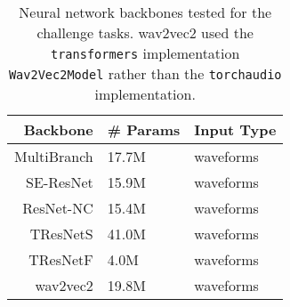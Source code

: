 
\begin{table}[!htp]
\centering
\begin{tabular}{r|l|l}
    \hline
    Backbone & \# Params & Input Type \\ \hline
    MultiBranch \cite{Kang_2022_cinc2021_iop} & 17.7M & waveforms \\
    SE-ResNet \cite{Kang_2022_cinc2021_iop} & 15.9M & waveforms  \\
    ResNet-NC \cite{ribeiro2020automatic} & 15.4M & waveforms  \\
    TResNetS \cite{Kang_2022_cinc2021_iop} & 41.0M & waveforms  \\
    TResNetF \cite{Kang_2022_cinc2021_iop} & 4.0M & waveforms  \\
    wav2vec2 \cite{baevski2020wav2vec} & 19.8M & waveforms \\ \hline
\end{tabular}
\caption{Neural network backbones tested for the challenge tasks. wav2vec2 used the \texttt{transformers} implementation \texttt{Wav2Vec2Model} rather than the \texttt{torchaudio} implementation.}
\label{tab:nn_backbone}
\end{table}
